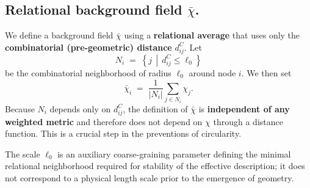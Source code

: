 \subsection{Relational background field \texorpdfstring{$\bar{\chi}$}{χ̄}.}
  \label{subsec:chi_bar}
  We define a background field $\bar{\chi}$ using a \textbf{relational average} that uses only the
  \textbf{combinatorial (pre-geometric) distance} $d_{ij}^{C}$.
  Let
  \begin{equation}
    N_i \;=\; \left\{ j \,\middle|\, d_{ij}^{C} \le \ell_0 \right\}
    \label{eq:combinatorial_neighborhood}
  \end{equation}
  be the combinatorial neighborhood of radius $\ell_0$ around node $i$.
  We then set
  \begin{equation}
    \bar{\chi}_i
    \;=\;
    \frac{1}{|N_i|}
    \sum_{j\in N_i} \chi_j.
    \label{eq:relational_average_bar_chi}
  \end{equation}
  Because $N_i$ depends only on $d_{ij}^{C}$, the definition of $\bar{\chi}$ is \textbf{independent
of any weighted metric} and therefore does not depend on $\chi$ through a distance function.
  This is a crucial step in the preventions of circularity.

  The scale $\ell_0$ is an auxiliary coarse-graining parameter defining the minimal
  relational neighborhood required for stability of the effective description; it does
  not correspond to a physical length scale prior to the emergence of geometry.
